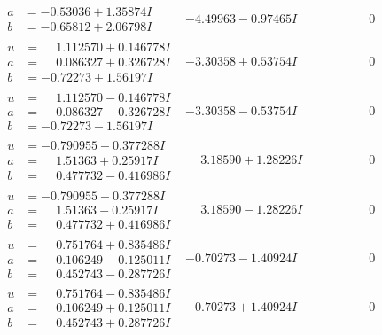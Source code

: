 \documentclass[1p]{elsarticle_modified}
\theoremstyle{definition}
\begin{document}
$$\begin{array}{c|c|c}
\begin{aligned}
a &= -0.53036 + 1.35874 I \\
b &= -0.65812 + 2.06798 I\end{aligned}
 & -4.49963 - 0.97465 I & \phantom{-0.000000 } 0 \\ \hline\begin{aligned}
u &= \phantom{-}1.112570 + 0.146778 I \\
a &= \phantom{-}0.086327 + 0.326728 I \\
b &= -0.72273 + 1.56197 I\end{aligned}
 & -3.30358 + 0.53754 I & \phantom{-0.000000 } 0 \\ \hline\begin{aligned}
u &= \phantom{-}1.112570 - 0.146778 I \\
a &= \phantom{-}0.086327 - 0.326728 I \\
b &= -0.72273 - 1.56197 I\end{aligned}
 & -3.30358 - 0.53754 I & \phantom{-0.000000 } 0 \\ \hline\begin{aligned}
u &= -0.790955 + 0.377288 I \\
a &= \phantom{-}1.51363 + 0.25917 I \\
b &= \phantom{-}0.477732 - 0.416986 I\end{aligned}
 & \phantom{-}3.18590 + 1.28226 I & \phantom{-0.000000 } 0 \\ \hline\begin{aligned}
u &= -0.790955 - 0.377288 I \\
a &= \phantom{-}1.51363 - 0.25917 I \\
b &= \phantom{-}0.477732 + 0.416986 I\end{aligned}
 & \phantom{-}3.18590 - 1.28226 I & \phantom{-0.000000 } 0 \\ \hline\begin{aligned}
u &= \phantom{-}0.751764 + 0.835486 I \\
a &= \phantom{-}0.106249 - 0.125011 I \\
b &= \phantom{-}0.452743 - 0.287726 I\end{aligned}
 & -0.70273 - 1.40924 I & \phantom{-0.000000 } 0 \\ \hline\begin{aligned}
u &= \phantom{-}0.751764 - 0.835486 I \\
a &= \phantom{-}0.106249 + 0.125011 I \\
b &= \phantom{-}0.452743 + 0.287726 I\end{aligned}
 & -0.70273 + 1.40924 I & \phantom{-0.000000 } 0\\

\end{array}$$
\end{document}
